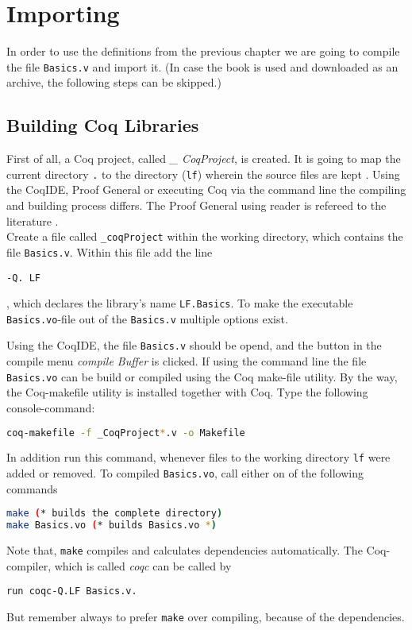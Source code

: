 \section{Importing}


In order to use the definitions from the previous chapter we are going to compile the file 
\texttt{Basics.v} and import it.
(In case the book \cite{PACGGHSY} is used and downloaded as an archive, the following steps can be skipped.)   

\subsection{Building Coq Libraries}

First of all, a Coq project, called {\itshape \_ CoqProject}, is created.  
It is going to map the current directory \texttt{.} to the directory (\texttt{lf}) wherein the source files are kept .
Using the CoqIDE, Proof General or executing Coq via the command line the compiling and building process differs.
The Proof General using reader is refereed to the literature \cite[chp. Induction, Proof by Induction]{PACGGHSY}.\\

Create a file called \texttt{\_coqProject} within the working directory, which contains the file \texttt{Basics.v}.
Within this file add the line 

\begin{lstlisting}
-Q. LF
\end{lstlisting}

, which declares the library's name \texttt{LF.Basics}. 
To make the executable \texttt{Basics.vo}-file out of the \texttt{Basics.v} multiple options exist.

Using the CoqIDE, the file \texttt{Basics.v} should be opend, and the button in the compile menu {\itshape compile Buffer} is clicked.
If using the command line the file \texttt{Basics.vo} can be build or compiled using the Coq  make-file utility.
By the way, the Coq-makefile utility is installed together with Coq.
Type the following console-command:
\begin{lstlisting}[language=bash]
coq-makefile -f _CoqProject*.v -o Makefile
\end{lstlisting}

In addition run this command, whenever files to the working directory \texttt{lf} were added or removed.
To compiled \texttt{Basics.vo}, call either on of the following commands 
\begin{lstlisting}[language=bash]
make (* builds the complete directory)
make Basics.vo (* builds Basics.vo *)
\end{lstlisting}
Note that, \lstinline!make! compiles and calculates dependencies automatically. 
The Coq-compiler, which is called {\itshape coqc} can be called by 
\begin{lstlisting}
run coqc-Q.LF Basics.v.
\end{lstlisting}
But remember always to prefer \texttt{make} over compiling, because of the dependencies.\\
 
